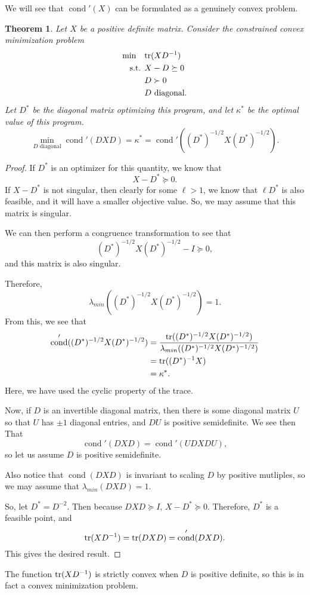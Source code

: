 \documentclass{amsart}
\newtheorem{theorem}{Theorem}[section]
\theoremstyle{definition}
\newcommand{\tr}{\textup{tr}}
\DeclareMathOperator{\cond}{cond}
\newcommand{\st}{{\text{ s.t. }}}
\begin{document}
We will see that $\cond'(X)$ can be formulated as a genuinely convex problem.
\begin{theorem}
    Let $X$ be a positive definite matrix. Consider the constrained convex minimization problem
    \begin{equation}
        \label{eq:opt}
        \begin{aligned}
            \min\quad & \tr(XD^{-1})\\
            \st & X - D \succeq 0\\
                &D \succ 0\\
                &D \text{ diagonal}.\\
        \end{aligned}
    \end{equation}
    Let $D^*$ be the diagonal matrix optimizing this program, and let $\kappa^*$ be the optimal value of this program.
    \[
        \min_{D \text{ diagonal}}\cond'(DXD) = \kappa^* = \cond'((D^*)^{-1/2}X(D^*)^{-1/2}).
    \]
\end{theorem}
\begin{proof}
    If $D^*$ is an optimizer for this quantity, we know that
    \[
        X - D^* \succeq 0.
    \]
    If $X - D^*$ is not singular, then clearly for some $\ell > 1$, we know that $\ell D^*$ is also feasible, and it will have a smaller objective value.
    So, we may assume that this matrix is singular.

    We can then perform a congruence transformation to see that
    \[
        (D^*)^{-1/2}X(D^*)^{-1/2} - I \succeq 0,
    \]
    and this matrix is also singular.

    Therefore, 
    \[
        \lambda_{min}((D^*)^{-1/2}X(D^*)^{-1/2}) = 1.
    \]
    From this, we see that 
    \begin{align*}
        \cond'((D^*)^{-1/2}X(D^*)^{-1/2}) &= \frac{\tr((D^*)^{-1/2}X(D^*)^{-1/2})}{\lambda_{min}((D^*)^{-1/2}X(D^*)^{-1/2}) } \\
        &= \tr((D^*)^{-1}X)\\
        &= \kappa^*.
    \end{align*}
    Here, we have used the cyclic property of the trace.

    Now, if $D$ is an invertible diagonal matrix, then there is some diagonal matrix $U$ so that $U$ has $\pm 1$ diagonal entries, and $DU$ is positive semidefinite.
    We see then That
    \[
        \cond'(DXD) = \cond'(UDXDU),
    \]
    so let us assume $D$ is positive semidefinite.

    Also notice that $\cond(DXD)$ is invariant to scaling $D$ by positive mutliples, so we may assume that $\lambda_{min}(DXD) = 1$.

    So, let $D^* = D^{-2}$. Then because $DXD \succeq I$, $X - D^* \succeq 0$. Therefore, $D^*$ is a feasible point, and
    \[
        \tr(XD^{-1}) = \tr(DXD) = \cond'(DXD).
    \]
    This gives the desired result.
\end{proof}
The function $\tr(XD^{-1})$ is strictly convex when $D$ is positive definite, so this is in fact a convex minimization problem.
\end{document}
